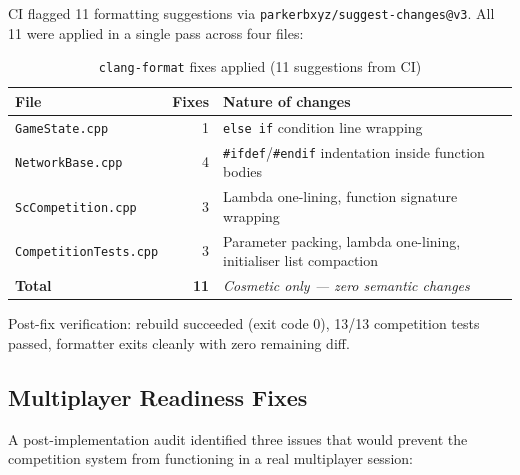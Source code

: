 \documentclass[12pt,a4paper]{article}
\begin{document}
CI flagged 11 formatting suggestions via \texttt{parkerbxyz/suggest-changes@v3}.
All 11 were applied in a single pass across four files:

\begin{table}[h!]
\centering
\begin{tabularx}{\linewidth}{lrX}
\toprule
\textbf{File} & \textbf{Fixes} & \textbf{Nature of changes} \\
\midrule
\texttt{GameState.cpp} & 1 & \texttt{else if} condition line wrapping \\
\texttt{NetworkBase.cpp} & 4 & \texttt{\#ifdef}/\texttt{\#endif} indentation inside function bodies \\
\texttt{ScCompetition.cpp} & 3 & Lambda one-lining, function signature wrapping \\
\texttt{CompetitionTests.cpp} & 3 & Parameter packing, lambda one-lining, initialiser list compaction \\
\midrule
\textbf{Total} & \textbf{11} & \textit{Cosmetic only --- zero semantic changes} \\
\bottomrule
\end{tabularx}
\caption{\texttt{clang-format} fixes applied (11 suggestions from CI)}
\end{table}

Post-fix verification: rebuild succeeded (exit code 0), 13/13 competition tests passed,
formatter exits cleanly with zero remaining diff.

\subsection{Multiplayer Readiness Fixes}

A post-implementation audit identified three issues that would prevent the competition
system from functioning in a real multiplayer session:
\end{document}
